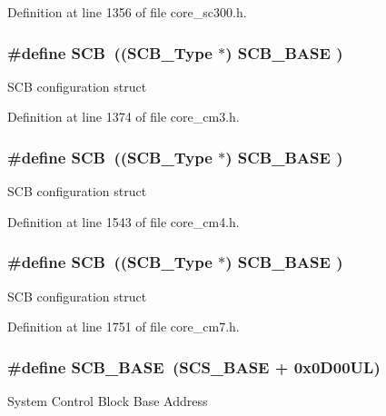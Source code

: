 Definition at line 1356 of file core\+\_\+sc300.\+h.

\subsubsection[{\texorpdfstring{S\+CB}{SCB}}]{\setlength{\rightskip}{0pt plus 5cm}\#define S\+CB~(({\bf S\+C\+B\+\_\+\+Type}       $\ast$)     {\bf S\+C\+B\+\_\+\+B\+A\+SE}      )}\hypertarget{group___c_m_s_i_s__core__base_gaaaf6477c2bde2f00f99e3c2fd1060b01}{}\label{group___c_m_s_i_s__core__base_gaaaf6477c2bde2f00f99e3c2fd1060b01}
S\+CB configuration struct 

Definition at line 1374 of file core\+\_\+cm3.\+h.

\subsubsection[{\texorpdfstring{S\+CB}{SCB}}]{\setlength{\rightskip}{0pt plus 5cm}\#define S\+CB~(({\bf S\+C\+B\+\_\+\+Type}       $\ast$)     {\bf S\+C\+B\+\_\+\+B\+A\+SE}      )}\hypertarget{group___c_m_s_i_s__core__base_gaaaf6477c2bde2f00f99e3c2fd1060b01}{}\label{group___c_m_s_i_s__core__base_gaaaf6477c2bde2f00f99e3c2fd1060b01}
S\+CB configuration struct 

Definition at line 1543 of file core\+\_\+cm4.\+h.

\subsubsection[{\texorpdfstring{S\+CB}{SCB}}]{\setlength{\rightskip}{0pt plus 5cm}\#define S\+CB~(({\bf S\+C\+B\+\_\+\+Type}       $\ast$)     {\bf S\+C\+B\+\_\+\+B\+A\+SE}      )}\hypertarget{group___c_m_s_i_s__core__base_gaaaf6477c2bde2f00f99e3c2fd1060b01}{}\label{group___c_m_s_i_s__core__base_gaaaf6477c2bde2f00f99e3c2fd1060b01}
S\+CB configuration struct 

Definition at line 1751 of file core\+\_\+cm7.\+h.

\subsubsection[{\texorpdfstring{S\+C\+B\+\_\+\+B\+A\+SE}{SCB_BASE}}]{\setlength{\rightskip}{0pt plus 5cm}\#define S\+C\+B\+\_\+\+B\+A\+SE~({\bf S\+C\+S\+\_\+\+B\+A\+SE} +  0x0\+D00\+U\+L)}\hypertarget{group___c_m_s_i_s__core__base_gad55a7ddb8d4b2398b0c1cfec76c0d9fd}{}\label{group___c_m_s_i_s__core__base_gad55a7ddb8d4b2398b0c1cfec76c0d9fd}
System Control Block Base Address 

